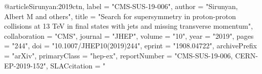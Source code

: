 @article{Sirunyan:2019ctn,
      label          = "CMS-SUS-19-006",
      author         = "Sirunyan, Albert M and others",
      title          = "{Search for supersymmetry in proton-proton collisions at
                        13 TeV in final states with jets and missing transverse
                        momentum}",
      collaboration  = "CMS",
      journal        = "JHEP",
      volume         = "10",
      year           = "2019",
      pages          = "244",
      doi            = "10.1007/JHEP10(2019)244",
      eprint         = "1908.04722",
      archivePrefix  = "arXiv",
      primaryClass   = "hep-ex",
      reportNumber   = "CMS-SUS-19-006, CERN-EP-2019-152",
      SLACcitation   = "%
}

